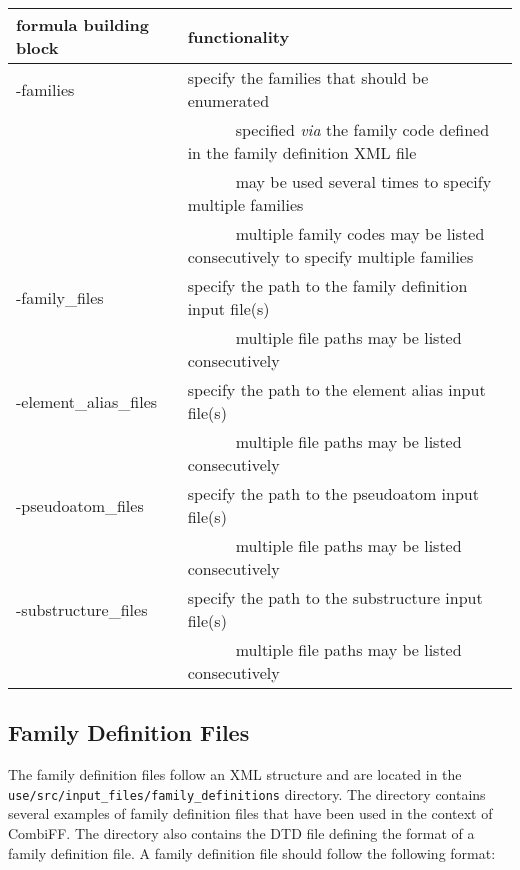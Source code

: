 \documentclass[a4paper,11pt]{article}
\newcommand{\tabitem}{~~\llap{\textbullet}~~}
\begin{document}
\begin{table}[H]
\begin{tabular}{>{\ttfamily\raggedright}p{}|p{}}
    \hline
    \textnormal{formula building block} & functionality \\
    \hline\hline
    -families & specify the families that should be enumerated\\
              & ~~\tabitem specified \textit{via} the family code defined in the family definition XML file\\
              & ~~\tabitem may be used several times to specify multiple families\\
              & ~~\tabitem multiple family codes may be listed consecutively to specify multiple families\\
    \hline
    -family\_files & specify the path to the family definition input file(s)\\
                   & ~~\tabitem multiple file paths may be listed consecutively\\
    \hline
    -element\_alias\_files & specify the path to the element alias input file(s)\\
                   & ~~\tabitem multiple file paths may be listed consecutively\\
    \hline
    -pseudoatom\_files & specify the path to the pseudoatom input file(s)\\
                   & ~~\tabitem multiple file paths may be listed consecutively\\
    \hline
    -substructure\_files & specify the path to the substructure input file(s)\\
                   & ~~\tabitem multiple file paths may be listed consecutively\\
\end{tabular}
\end{table}

\subsection{Family Definition Files}\label{sec:family}

The family definition files follow an XML structure and are located in the \texttt{use/src/input\_files/family\_definitions} directory. The directory contains several examples of family definition files that have been used in the context of CombiFF. The directory also contains the DTD file defining the format of a family definition file. A family definition file should follow the following format:
\end{document}

